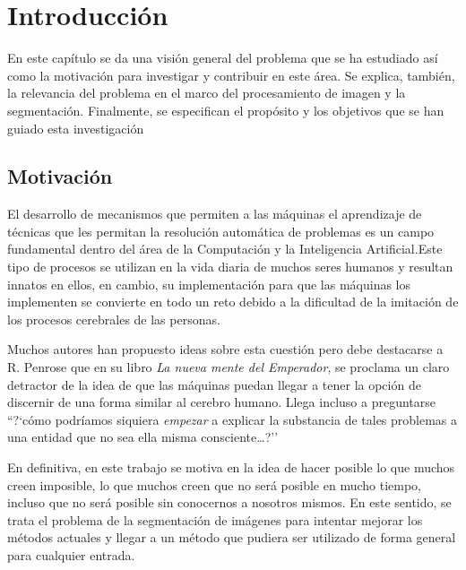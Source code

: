 \chapter{Introducción}

En este capítulo se da una visión general del problema que se ha estudiado así como la motivación para investigar y contribuir en este área. Se explica, también, la relevancia del problema en el marco del procesamiento de imagen y la segmentación. Finalmente, se especifican el propósito y los objetivos que se han guiado esta investigación


\section{Motivación}\label{sec:motivacion}

El desarrollo de mecanismos que permiten a las máquinas el aprendizaje de técnicas que les permitan la resolución automática de problemas es un campo fundamental dentro del área de la Computación y la Inteligencia Artificial.Este tipo de procesos se utilizan en la vida diaria de muchos seres humanos y resultan innatos en ellos, en cambio, su implementación para que las máquinas los implementen se convierte en todo un reto debido a la dificultad de la imitación de los procesos cerebrales de las personas.

Muchos autores \cite{lib:ross, lib:boden, art:searle, art:churchland} han propuesto ideas sobre esta cuestión pero debe destacarse a R. Penrose \cite{lib:penrose} que en su libro {\em La nueva mente del Emperador},  se proclama un claro detractor de la idea de que las máquinas puedan llegar a tener la opción de discernir de una forma similar al cerebro humano. Llega incluso a preguntarse ``?`cómo podríamos siquiera {\em empezar} a explicar la substancia de tales problemas a una entidad que no sea ella misma consciente\dots?''

En definitiva, en este trabajo se motiva en la idea de hacer posible lo que muchos creen imposible, lo que muchos creen que no será posible en mucho tiempo, incluso que no será posible sin conocernos a nosotros mismos. En este sentido, se trata el problema de la segmentación de imágenes para intentar mejorar los métodos actuales y llegar a un método que pudiera ser utilizado de forma general para cualquier entrada.


